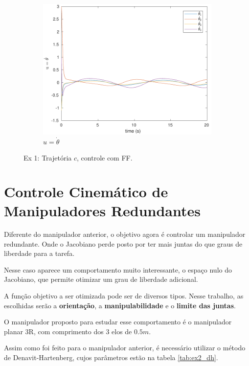 \documentclass[a4paper,11pt]{article}
\theoremstyle{mytheor}
\begin{document}
\begin{figure}[!ht]
\begin{minipage}{\linewidth}
    \begin{subfigure}[b]{0.4\textwidth}
    \includegraphics[width=1\textwidth]{figs/ex1_c_1_dq.pdf}
    \caption{$u = \dot{\theta}$}
    \label{fig:ex1_c_1_dq}
    \end{subfigure}
  \end{minipage}
\caption{Ex 1: Trajetória $c$, controle com FF.}
\label{fig:ex1_c_1}
\end{figure}


\section{Controle Cinemático de Manipuladores Redundantes} %

Diferente do manipulador anterior, o objetivo agora é controlar um manipulador redundante. Onde o Jacobiano perde posto por ter mais juntas do que graus de liberdade para a tarefa. 

Nesse caso aparece um comportamento muito interessante, o espaço nulo do Jacobiano, que permite otimizar um grau de liberdade adicional.

A função objetivo a ser otimizada pode ser de diversos tipos. Nesse trabalho, as escolhidas serão a \textbf{orientação},  a \textbf{manipulabilidade} e o \textbf{limite das juntas}.

O manipulador proposto para estudar esse comportamento é o manipulador planar 3R, com comprimento dos 3 elos de $0.5m$.

Assim como foi feito para o manipulador anterior, é necessário utilizar o método de Denavit-Hartenberg, cujos parâmetros estão na tabela \ref{tab:ex2_dh}.
\end{document}
